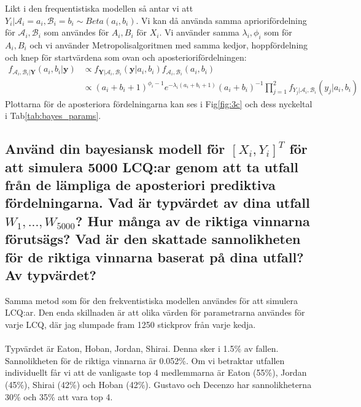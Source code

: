 \documentclass{article}
\begin{document}
Likt i den frequentistiska modellen så antar vi att $Y_i | \mathcal{A}_i = a_i, \mathcal{B}_i = b_i \sim Beta(a_i, b_i)$. 
Vi kan då använda samma apriorifördelning för $\mathcal{A}_i, \mathcal{B}_i$ som användes för $A_i, B_i$ för $X_i$. Vi använder samma $\lambda_i, \phi_i$ som för $A_i, B_i$ och vi använder Metropolisalgoritmen med samma kedjor, hoppfördelning och knep för startvärdena som ovan och aposteriorifördelningen:
\begin{align*}
    f_{\mathcal{A}_i, \mathcal{B}_i | \mathbf{Y}}(a_i, b_i | \mathbf{y}) &\propto f_{\mathbf{Y} | \mathcal{A}_i, \mathcal{B}_i}(\mathbf{y} | a_i, b_i) f_{\mathcal{A}_i, \mathcal{B}_i}(a_i, b_i) \\
    &\propto (a_i + b_i + 1)^{\phi_i - 1} e^{-\lambda_i(a_i + b_i + 1)} (a_i + b_i)^{-1} \prod\limits_{j=1}^2 f_{Y_j | \mathcal{A}_i, \mathcal{B}_i}(y_j | a_i, b_i)
\end{align*}
Plottarna för de aposteriora fördelningarna kan ses i Fig\ref{fig:3c} och dess nyckeltal i Tab\ref{tab:bayes_params}.

\subsection{Använd din bayesiansk modell för $[X_i,Y_i]^T$ för att simulera 5000 LCQ:ar genom att ta utfall från de lämpliga de aposteriori prediktiva fördelningarna.
Vad är typvärdet av dina utfall $W_1,...,W_{5000}$? Hur många av de riktiga vinnarna förutsägs? Vad är den skattade sannolikheten för de riktiga vinnarna baserat på dina utfall? Av typvärdet?}

Samma metod som för den frekventistiska modellen användes för att simulera LCQ:ar. 
Den enda skillnaden är att olika värden för parametrarna användes för varje LCQ, där jag slumpade fram 1250 stickprov från varje kedja.
\\\\
Typvärdet är Eaton, Hoban, Jordan, Shirai. Denna sker i 1.5\% av fallen. Sannolikheten för de riktiga vinnarna är 0.052\%. 
Om vi betraktar utfallen individuellt får vi att de vanligaste top 4 medlemmarna är Eaton (55\%), Jordan (45\%), Shirai (42\%) och Hoban (42\%). 
Gustavo och Decenzo har sannolikheterna 30\% och 35\% att vara top 4.
\end{document}
